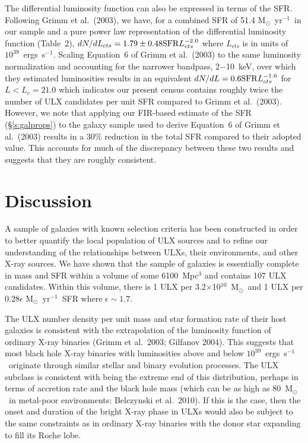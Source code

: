 \documentclass{article}
\newcommand{\msun}{M$_{\odot}$}
\newcommand{\msfr}{M$_{\odot}$~yr$^{-1}$}
\newcommand{\ergl}{ergs~s$^{-1}$}
\newcommand{\etal}{et al.}
\begin{document}
The differential luminosity function can also be expressed in terms of the 
 SFR. Following Grimm \etal\ (2003), we have, for a combined SFR of 51.4 \msfr\ in our sample
 and a pure power law representation of the differential luminosity function (Table~2),
 $dN/dL_{cts} = 1.79\pm0.48 {\rm SFR} L_{cts}^{-2.0}$ where $L_{cts}$ is in units of 
 $10^{39}$~\ergl. 
Scaling Equation~6 of Grimm \etal\ (2003) to the same luminosity normalization and 
 accounting for the narrower bandpass, 2$-$10~keV, over which they estimated luminosities
 results in an equivalent $dN/dL = 0.6 {\rm SFR} L_{cts}^{-1.6}$ for $L<L_c=21.0$
 which indicates our present census contains roughly twice the number of ULX candidates
 per unit SFR compared to Grimm \etal\ (2003).
However, we note that applying our FIR-based estimate of the SFR (\S \ref{s:galprops})
 to the galaxy sample used to derive Equation~6 of Grimm \etal\ (2003)
 results in a 30\% reduction in the total SFR compared to their adopted value.
This accounts for much of the discrepancy between these two results
 and suggests that they are roughly consistent. 
 
\section{Discussion} \label{s:discussion}

A sample of galaxies 
  with known selection criteria has been constructed in order
   to better quantify the local population of ULX sources and to 
   refine our understanding of the relationships between ULXs,
 their environments, and other X-ray sources. 
We have shown that the sample of galaxies is essentially complete in mass and SFR within 
  a volume of some 6100~Mpc$^3$ and contains 107 ULX candidates.
Within this volume, there is  1 ULX per 3.2$\times$10$^{10}$~\msun\ and 1 ULX per 0.28$\epsilon$ \msfr\ 
 SFR where $\epsilon \sim 1.7$.
 
The ULX number density per unit mass and star formation rate of 
 their host galaxies is consistent with the extrapolation of the 
 luminosity function of ordinary X-ray binaries (Grimm \etal\ 2003; Gilfanov 2004).
This suggests that most black hole X-ray binaries with luminosities above and below
 $10^{39}$~\ergl\ originate through similar stellar and binary evolution processes.
The ULX subclass is consistent with being the extreme end of this distribution,
 perhaps in terms of accretion rate and the black hole mass (which can be as high as 
 80~\msun\ in metal-poor environments: Belczynski \etal\ 2010).
If this is the case, then the onset and duration of the bright X-ray phase in
 ULXs would also be subject to the same constraints as in ordinary X-ray binaries
 with the donor star expanding to fill its Roche lobe.
 
\end{document}
